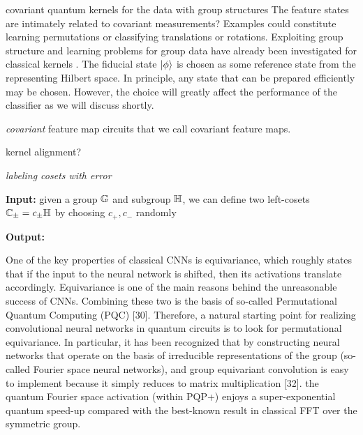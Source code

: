 covariant quantum kernels for the data with group structures
\cite{glickCovariantQuantumKernels2021}
The feature states are intimately related to covariant measurements?
Examples could constitute learning permutations or classifying translations or rotations. Exploiting group structure and learning problems for group data have already been investigated for classical kernels \cite{kondorGraphletSpectrum2009}.
The fiducial state $\ket{\phi}$ is chosen as some reference state from the representing Hilbert space. 
In principle, any state that can be prepared efficiently may be chosen. 
However, the choice will greatly affect the performance of the classifier as we will discuss shortly.
\begin{definition}[Covariant]\label{def:covariant}
	\emph{covariant}
	feature map circuits that we call covariant feature maps. 
\end{definition}
kernel alignment?
\begin{problem}
	\emph{labeling cosets with error}

	\textbf{Input:} given a group $\mathbb{G}$ and subgroup $\mathbb{H}$,
	we can define two left-cosets $\mathbb{C}_{\pm}=c_{\pm}\mathbb{H}$ by choosing $c_+,c_-$ randomly

	\textbf{Output:} 

\end{problem}
One of the key properties of classical CNNs is equivariance, which roughly states that if the input to the neural network is shifted, then its activations translate accordingly. 
Equivariance is one of the main reasons behind the unreasonable success of CNNs.
Combining these two is the basis of so-called Permutational Quantum Computing (PQC) [30]. Therefore, a natural starting point for realizing convolutional neural networks in quantum circuits is to look for permutational equivariance.
In particular, it has been recognized that by constructing neural networks that operate on the basis of irreducible representations of the group (so-called Fourier space neural networks), and group equivariant convolution is easy to implement because it simply reduces to matrix multiplication [32].
the quantum Fourier space activation (within PQP+) enjoys a super-exponential quantum speed-up compared with the best-known result in classical FFT over the symmetric group.

